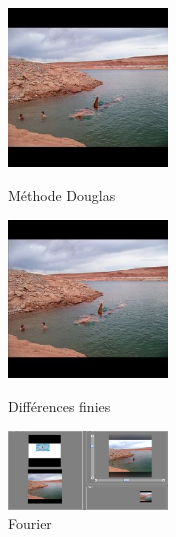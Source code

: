 \documentclass{article}
\begin{document}
\begin{figure}[!htb]
   \begin{minipage}{0.33\textwidth}
     \centering
     \includegraphics[width = 120pt]{Annexe/RequinD.png}
     \caption{Méthode Douglas}
      \end{minipage}\hfill
   \begin{minipage}{0.33\textwidth}
     \centering
     \includegraphics[width = 120pt]{Annexe/requinDF.png}
     \caption{Différences finies}
      \end{minipage}\hfill
   \begin{minipage}{0.33\textwidth}
     \centering
     \includegraphics[width= 120pt]{Annexe/RequinF.png}
     \caption{Fourier}
   \end{minipage}
\end{figure}
\end{document}

